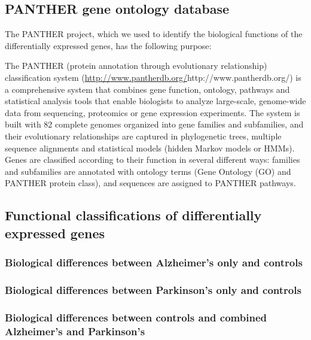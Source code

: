 \subsection{PANTHER gene ontology database}
\label{subsec:panth-gene-ontol}

The PANTHER project, which we used to identify the biological functions of the differentially expressed genes, has the following purpose\cite{PANTHER}:\\

\begin{blockquote}
  The PANTHER (protein annotation through evolutionary relationship) classification system (\url{http://www.pantherdb.org/}{http://www.pantherdb.org/}) is a comprehensive system that combines gene function, ontology, pathways and statistical analysis tools that enable biologists to analyze large-scale, genome-wide data from sequencing, proteomics or gene expression experiments. The system is built with 82 complete genomes organized into gene families and subfamilies, and their evolutionary relationships are captured in phylogenetic trees, multiple sequence alignments and statistical models (hidden Markov models or HMMs). Genes are classified according to their function in several different ways: families and subfamilies are annotated with ontology terms (Gene Ontology (GO) and PANTHER protein class), and sequences are assigned to PANTHER pathways.
\end{blockquote}

\subsection{Functional classifications of differentially expressed genes}
\label{subsec:funct-class-diff}

\subsubsection{Biological differences between Alzheimer's only and controls}
\label{subsubsec:biol-diff-betw}

\subsubsection{Biological differences between Parkinson's only and controls}
\label{subsubsec:biol-diff-betw-1}

\subsubsection{Biological differences between controls and combined Alzheimer's and Parkinson's}
\label{subsubsec:biol-diff-betw-2}

